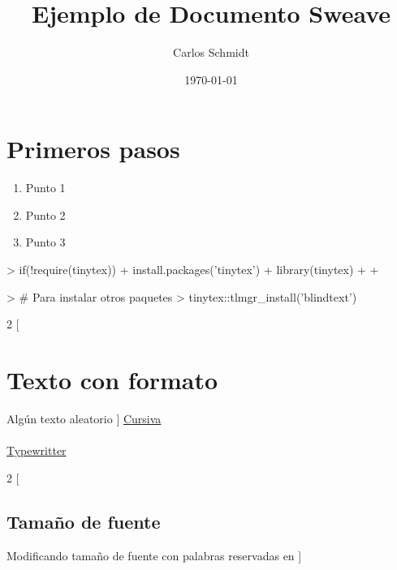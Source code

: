 \documentclass{article}
\title{Ejemplo de Documento Sweave}
\author{Carlos Schmidt}
\date{\today}
\begin{document}


\maketitle

\section*{Primeros pasos}

\begin{enumerate}
\item Punto 1
\item Punto 2
\item Punto 3

\end{enumerate}


\begin{Schunk}
\begin{Sinput}
> if(!require(tinytex)){
+   install.packages('tinytex')
+   library(tinytex)
+   
+ }
\end{Sinput}
\end{Schunk}


\begin{Schunk}
\begin{Sinput}
> # Para instalar otros paquetes
> tinytex::tlmgr_install('blindtext')
\end{Sinput}
\end{Schunk}

\begin{multicols}{2}
[
\section{Texto con formato}
Algún texto aleatorio
]
\noindent \underline{Cursiva}\\  \emph{\blindtext}   \\   \underline{Typewritter}  \\   \texttt{\blindtext}
\end{multicols}


\begin{multicols}{2}
[
\subsection{Tamaño de fuente}
Modificando tamaño de fuente con palabras reservadas en \LaTex
]
{\Huge \blindtext}   {\scriptsize \blindtext}
\end{multicols}
\end{document}
